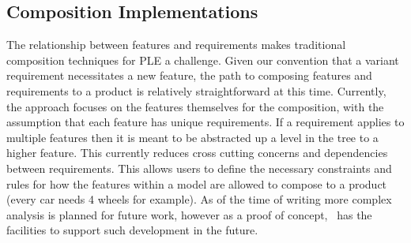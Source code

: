 \subsection{Composition Implementations}

The relationship between features and requirements makes traditional composition techniques for \ac{PLE} a challenge. Given our convention that a variant requirement necessitates a new feature, the path to composing features and requirements to a product is relatively straightforward at this time. Currently, the approach focuses on the features themselves for the composition, with the assumption that each feature has unique requirements. If a requirement applies to multiple features then it is meant to be abstracted up a level in the tree to a higher feature. This currently reduces cross cutting concerns and dependencies between requirements. This allows users to define the necessary constraints and rules for how the features within a model are allowed to compose to a product (every car needs 4 wheels for example). As of the time of writing more complex analysis is planned for future work, however as a proof of concept, \tool\ has the facilities to support such development in the future.
